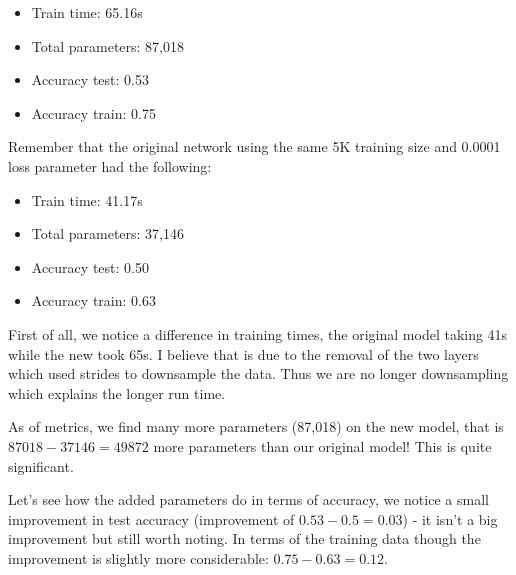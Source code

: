 \documentclass[10pt]{article}
\begin{document}
\begin{itemize}
    \item Train time: 65.16s
    \item Total parameters: 87,018
    \item Accuracy test: 0.53
    \item Accuracy train: 0.75
\end{itemize}

Remember that the original network using the same 5K training size and 0.0001
loss parameter had the following:

\begin{itemize}
    \item Train time: 41.17s
    \item Total parameters: 37,146
    \item Accuracy test: 0.50
    \item Accuracy train: 0.63
\end{itemize}

First of all, we notice a difference in training times, the original model
taking 41s while the new took 65s. I believe that is due to the removal of the two
layers which used strides to downsample the data. Thus we are no longer downsampling
which explains the longer run time.

As of metrics, we find many more parameters (87,018) on the new model, that is
$87018 - 37146 = 49872$ more parameters than our original model! This is quite significant.

Let's see how the added parameters do in terms of accuracy, we notice a small
improvement in test accuracy (improvement of $0.53 - 0.5 = 0.03$) - it isn't a big improvement
but still worth noting.
In terms of the training data though the improvement is slightly more considerable: $0.75 - 0.63 = 0.12$.
\end{document}
